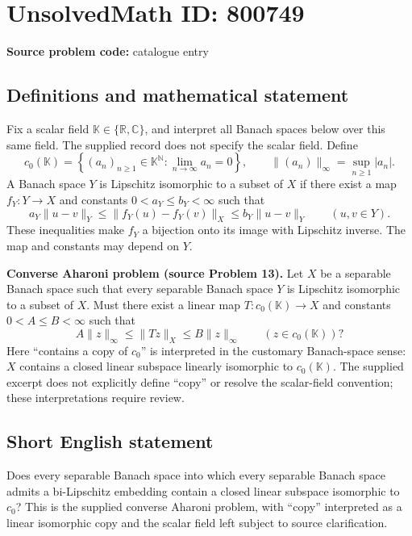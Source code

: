 \documentclass[11pt]{article}
\newcommand{\N}{\mathbb{N}}
\newcommand{\R}{\mathbb{R}}
\newcommand{\C}{\mathbb{C}}
\begin{document}
\section*{UnsolvedMath ID: 800749}
\textbf{Source problem code:} catalogue entry
\subsection{Definitions and mathematical statement}
Fix a scalar field \(\mathbb K\in\{\R,\C\}\), and interpret all Banach spaces below over this same field. The supplied record does not specify the scalar field. Define
\[
c_0(\mathbb K)=\left\{(a_n)_{n\geq1}\in\mathbb K^{\N}:\lim_{n\to\infty}a_n=0\right\},\qquad
\|(a_n)\|_\infty=\sup_{n\geq1}|a_n|.
\]
A Banach space \(Y\) is Lipschitz isomorphic to a subset of \(X\) if there exist a map \(f_Y:Y\to X\) and constants \(0<a_Y\leq b_Y<\infty\) such that
\[
a_Y\|u-v\|_Y\leq\|f_Y(u)-f_Y(v)\|_X\leq b_Y\|u-v\|_Y
\qquad(u,v\in Y).
\]
These inequalities make \(f_Y\) a bijection onto its image with Lipschitz inverse. The map and constants may depend on \(Y\).

\textbf{Converse Aharoni problem (source Problem 13).} Let \(X\) be a separable Banach space such that every separable Banach space \(Y\) is Lipschitz isomorphic to a subset of \(X\). Must there exist a linear map \(T:c_0(\mathbb K)\to X\) and constants \(0<A\leq B<\infty\) such that
\[
A\|z\|_\infty\leq\|Tz\|_X\leq B\|z\|_\infty
\qquad(z\in c_0(\mathbb K))?
\]
Here ``contains a copy of \(c_0\)'' is interpreted in the customary Banach-space sense: \(X\) contains a closed linear subspace linearly isomorphic to \(c_0(\mathbb K)\). The supplied excerpt does not explicitly define ``copy'' or resolve the scalar-field convention; these interpretations require review.
\subsection{Short English statement}
Does every separable Banach space into which every separable Banach space admits a bi-Lipschitz embedding contain a closed linear subspace isomorphic to \(c_0\)? This is the supplied converse Aharoni problem, with ``copy'' interpreted as a linear isomorphic copy and the scalar field left subject to source clarification.
\end{document}
